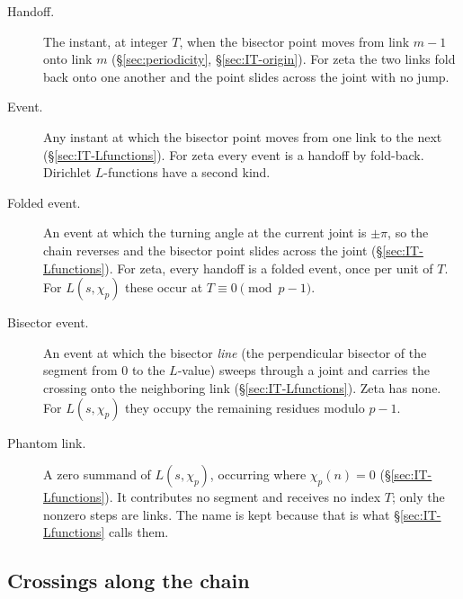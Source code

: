 \documentclass[11pt]{article}
\theoremstyle{definition}
\begin{document}
\begin{description}
\item[Handoff.]
The instant, at integer $T$, when the bisector point moves from
link $m-1$ onto link $m$
(\S\ref{sec:periodicity}, \S\ref{sec:IT-origin}).
For zeta the two links fold back onto one another and the point
slides across the joint with no jump.

\item[Event.]
Any instant at which the bisector point moves from one link to the
next (\S\ref{sec:IT-Lfunctions}).
For zeta every event is a handoff by fold-back.
Dirichlet $L$-functions have a second kind.

\item[Folded event.]
An event at which the turning angle at the current joint is
$\pm\pi$, so the chain reverses and the bisector point slides
across the joint (\S\ref{sec:IT-Lfunctions}).
For zeta, every handoff is a folded event, once per unit of $T$.
For $L(s,\chi_p)$ these occur at $T\equiv0\pmod{p-1}$.

\item[Bisector event.]
An event at which the bisector \emph{line} (the perpendicular
bisector of the segment from $0$ to the $L$-value) sweeps through
a joint and carries the crossing onto the neighboring link
(\S\ref{sec:IT-Lfunctions}).
Zeta has none.
For $L(s,\chi_p)$ they occupy the remaining residues modulo
$p-1$.

\item[Phantom link.]
A zero summand of $L(s,\chi_p)$, occurring where $\chi_p(n)=0$
(\S\ref{sec:IT-Lfunctions}).
It contributes no segment and receives no index $T$; only the
nonzero steps are links. The name is kept because that is what
\S\ref{sec:IT-Lfunctions} calls them.
\end{description}

\subsection*{Crossings along the chain}
\end{document}

